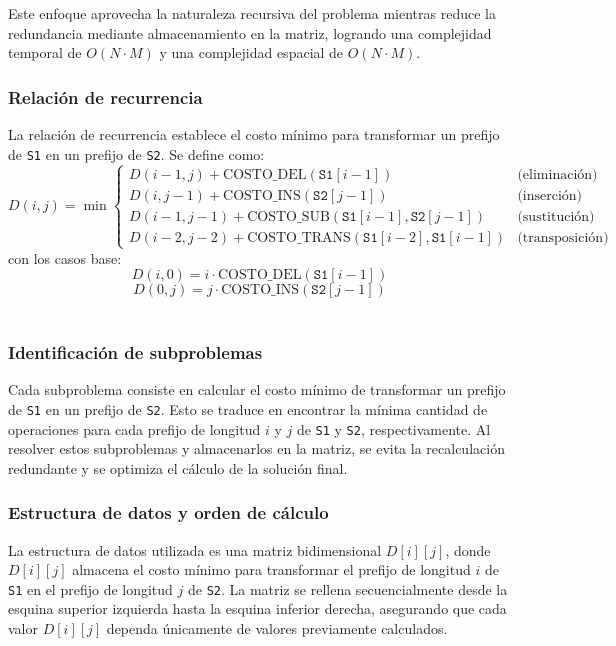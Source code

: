 Este enfoque aprovecha la naturaleza recursiva del problema mientras reduce la redundancia mediante almacenamiento en la matriz, logrando una complejidad temporal de \( O(N \cdot M) \) y una complejidad espacial de \( O(N \cdot M) \).


\subsubsection{Relación de recurrencia}

La relación de recurrencia establece el costo mínimo para transformar un prefijo de \texttt{S1} en un prefijo de \texttt{S2}. Se define como:
\[
D(i, j) = \min \begin{cases} 
      D(i-1, j) + \text{COSTO\_DEL}(\texttt{S1}[i-1]) & \text{(eliminación)} \\
      D(i, j-1) + \text{COSTO\_INS}(\texttt{S2}[j-1]) & \text{(inserción)} \\
      D(i-1, j-1) + \text{COSTO\_SUB}(\texttt{S1}[i-1], \texttt{S2}[j-1]) & \text{(sustitución)} \\
      D(i-2, j-2) + \text{COSTO\_TRANS}(\texttt{S1}[i-2], \texttt{S1}[i-1]) & \text{(transposición)}
   \end{cases}
\]
con los casos base:
\[
D(i, 0) = i \cdot \text{COSTO\_DEL}(\texttt{S1}[i-1])
\]
\[
D(0, j) = j \cdot \text{COSTO\_INS}(\texttt{S2}[j-1])
\]
\\
\subsubsection{Identificación de subproblemas}

Cada subproblema consiste en calcular el costo mínimo de transformar un prefijo de \texttt{S1} en un prefijo de \texttt{S2}. Esto se traduce en encontrar la mínima cantidad de operaciones para cada prefijo de longitud \( i \) y \( j \) de \texttt{S1} y \texttt{S2}, respectivamente. Al resolver estos subproblemas y almacenarlos en la matriz, se evita la recalculación redundante y se optimiza el cálculo de la solución final.

\subsubsection{Estructura de datos y orden de cálculo}

La estructura de datos utilizada es una matriz bidimensional \( D[i][j] \), donde \( D[i][j] \) almacena el costo mínimo para transformar el prefijo de longitud \( i \) de \texttt{S1} en el prefijo de longitud \( j \) de \texttt{S2}. La matriz se rellena secuencialmente desde la esquina superior izquierda hasta la esquina inferior derecha, asegurando que cada valor \( D[i][j] \) dependa únicamente de valores previamente calculados.

